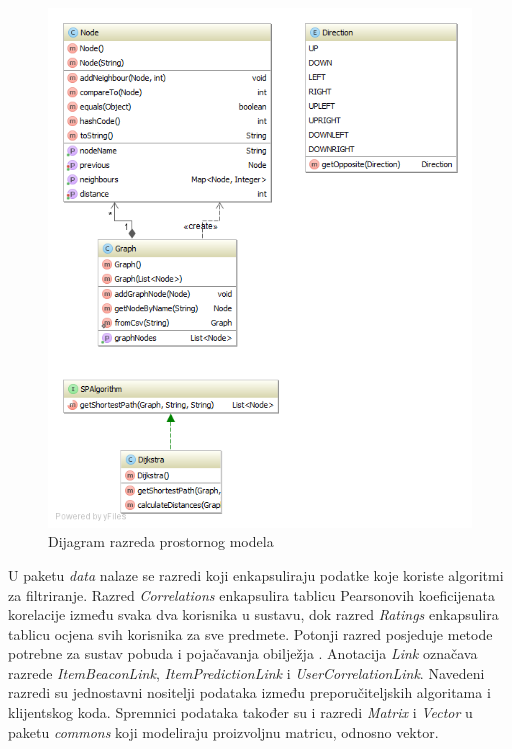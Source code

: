 \documentclass[times, utf8, diplomski, numeric]{fer}
\begin{document}
\begin{figure}[H]
	\centering
	\includegraphics[width=14cm]{images/diagrams/diagramspace.png}
	\caption{Dijagram razreda prostornog modela}
	\label{fig:diagramspace}
\end{figure}

U paketu \emph{data} nalaze se razredi koji enkapsuliraju podatke koje koriste
algoritmi za filtriranje. Razred \emph{Correlations} enkapsulira tablicu
Pearsonovih koeficijenata korelacije između svaka dva korisnika u sustavu, dok
razred \emph{Ratings} enkapsulira tablicu ocjena svih korisnika za sve predmete.
Potonji razred posjeduje metode potrebne za sustav pobuda i pojačavanja
obilježja . Anotacija  \emph{Link} označava
razrede \emph{ItemBeaconLink}, \emph{ItemPredictionLink} i
\emph{UserCorrelationLink}. Navedeni razredi su jednostavni nositelji podataka
između preporučiteljskih algoritama i klijentskog koda. Spremnici podataka
također su i razredi \emph{Matrix} i \emph{Vector} u paketu \emph{commons} koji
modeliraju proizvoljnu matricu, odnosno vektor.
\end{document}
